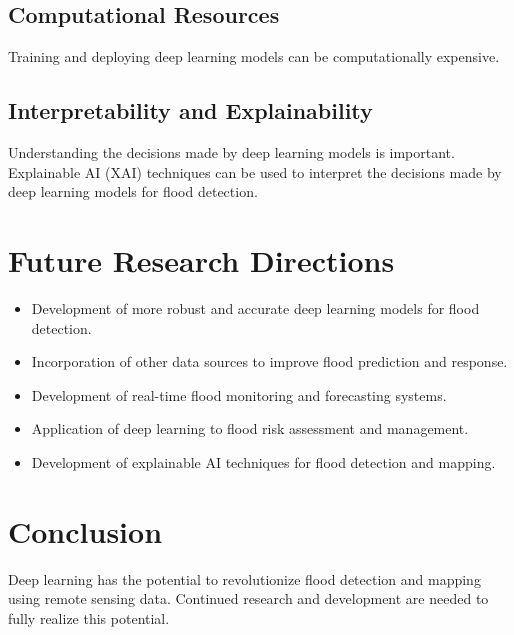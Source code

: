 \documentclass{article}
\begin{document}
\subsection{Computational Resources}

Training and deploying deep learning models can be computationally expensive.

\subsection{Interpretability and Explainability}

Understanding the decisions made by deep learning models is important. Explainable AI (XAI) techniques can be used to interpret the decisions made by deep learning models for flood detection.

\section{Future Research Directions}

\begin{itemize}
    \item Development of more robust and accurate deep learning models for flood detection.
    \item Incorporation of other data sources to improve flood prediction and response.
    \item Development of real-time flood monitoring and forecasting systems.
    \item Application of deep learning to flood risk assessment and management.
    \item Development of explainable AI techniques for flood detection and mapping.
\end{itemize}

\section{Conclusion}

Deep learning has the potential to revolutionize flood detection and mapping using remote sensing data. Continued research and development are needed to fully realize this potential.
\end{document}
